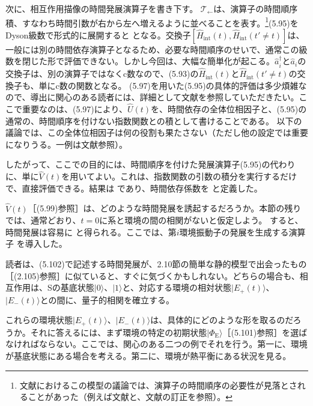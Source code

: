 \hypertarget{srcpage:210}{}\label{srcpage:210}
次に、相互作用描像の時間発展演算子を書き下す。
$\mathcal T_{\leftarrow}$は、演算子の時間順序積、すなわち時間引数が右から左へ増えるように並べることを表す。\footnote{文献におけるこの模型の議論では、演算子の時間順序の必要性が見落とされることがあった（例えば文献\cite{ref089}と、文献\cite{ref096,ref237}の訂正を参照）。}(5.95)をDyson級数\cite{ref058}で形式的に展開すると
となる。交換子$[\hat H_{\mathrm{int}}(t),\hat H_{\mathrm{int}}(t'\ne t)]$は、一般には別の時間依存演算子となるため、必要な時間順序のせいで、通常この級数を閉じた形で評価できない。しかし今回は、大幅な簡単化が起こる。$\hat a_i^{\dagger}$と$\hat a_i$の交換子は、別の演算子ではなくc数なので、(5.93)の$\hat H_{\mathrm{int}}(t)$と$\hat H_{\mathrm{int}}(t'\ne t)$の交換子も、単にc数の関数となる。
(5.97)を用いた(5.95)の具体的評価は多少煩雑なので、導出に関心のある読者には、詳細として文献\cite{ref237}を参照していただきたい。ここで重要なのは、(5.97)により、$\hat U(t)$を、時間依存の全体位相因子と、(5.95)の通常の、時間順序を付けない指数関数との積として書けることである。
以下の議論では、この全体位相因子は何の役割も果たさない（ただし他の設定では重要になりうる。一例は文献\cite{ref096}参照）。

\hypertarget{srcpage:211}{}\label{srcpage:211}
したがって、ここでの目的には、時間順序を付けた発展演算子(5.95)の代わりに、単に$\hat V(t)$を用いてよい。これは、指数関数の引数の積分を実行するだけで、直接評価できる。結果は
であり、時間依存係数を
と定義した。

$\hat V(t)$［(5.99)参照］は、どのような時間発展を誘起するだろうか。本節の残りでは、通常どおり、$t=0$に系と環境の間の相関がないと仮定しよう。
すると、時間発展は容易に
と得られる。ここでは、第$i$環境振動子の発展を生成する演算子
を導入した。

読者は、(5.102)で記述する時間発展が、2.10節の簡単な静的模型で出会ったもの［(2.105)参照］に似ていると、すぐに気づくかもしれない。どちらの場合も、相互作用は、Sの基底状態$|0\rangle$、$|1\rangle$と、対応する環境の相対状態$|E_+(t)\rangle$、$|E_-(t)\rangle$との間に、量子的相関を確立する。

これらの環境状態$|E_+(t)\rangle$、$|E_-(t)\rangle$は、具体的にどのような形を取るのだろうか。それに答えるには、まず環境の特定の初期状態$|\Phi_{\mathrm E}\rangle$［(5.101)参照］を選ばなければならない。ここでは、関心のある二つの例でそれを行う。第一に、環境が基底状態にある場合を考える。第二に、環境が熱平衡にある状況を見る。

